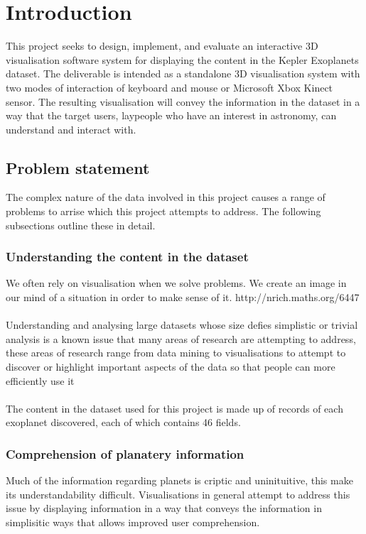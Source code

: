 \chapter{Introduction}\label{C:intro}
This project seeks to design, implement, and evaluate an interactive 3D visualisation software system for displaying the content in the Kepler Exoplanets dataset. The deliverable is intended as a standalone 3D visualisation system with two modes of interaction of keyboard and mouse or Microsoft Xbox Kinect sensor. The resulting visualisation will convey the information in the dataset in a way that the target users, laypeople who have an interest in astronomy, can understand and interact with.

\section{Problem statement}
The complex nature of the data involved in this project causes a range of problems to arrise which this project attempts to address. The following subsections outline these in detail.
\subsection{Understanding the content in the dataset}
We often rely on visualisation when we solve problems. We create an image in our mind of a situation in order to make sense of it. http://nrich.maths.org/6447
\\\\
Understanding and analysing large datasets whose size defies simplistic or trivial analysis is a known issue that many areas of research are attempting to address, these areas of research range from data mining to visualisations to attempt to discover or highlight important aspects of the data so that people can more efficiently use it
\\\\
The content in the dataset used for this project is made up of records of each exoplanet discovered, each of which contains 46 fields. 

\subsection{Comprehension of planatery information}
Much of the information regarding planets is criptic and uninituitive, this make its understandability difficult. Visualisations in general attempt to address this issue by displaying information in a way that conveys the information in simplisitic ways that allows improved user comprehension.

